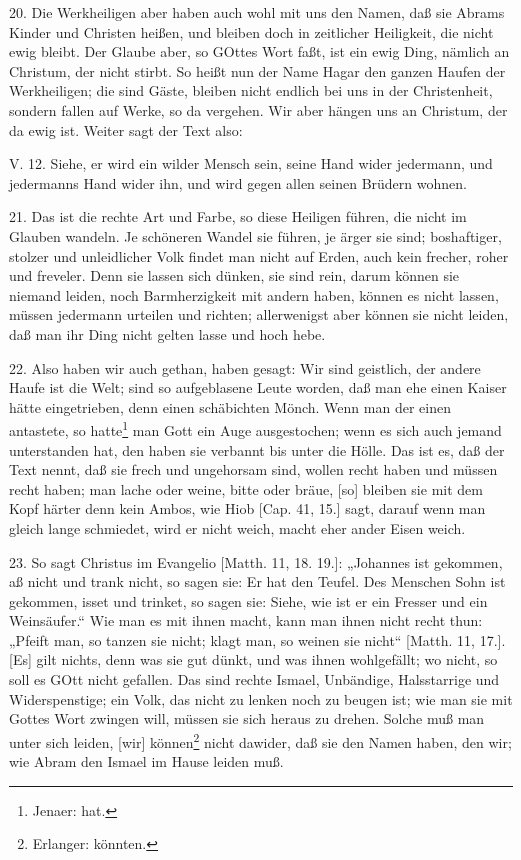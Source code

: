 20. Die Werkheiligen aber haben auch wohl mit uns den Namen, daß sie Abrams Kinder und Christen heißen, und bleiben doch in zeitlicher Heiligkeit, die nicht ewig bleibt. Der Glaube aber, so GOttes Wort faßt, ist ein ewig Ding, nämlich an Christum, der nicht stirbt. So heißt nun der Name Hagar den ganzen Haufen der Werkheiligen; die sind Gäste, bleiben nicht endlich bei uns in der Christenheit, sondern fallen auf Werke, so da vergehen. Wir aber hängen uns an Christum, der da ewig ist. Weiter sagt der Text also:

\begin{schriftzitat}
V. 12. Siehe, er wird ein wilder Mensch sein, seine Hand wider jedermann, und jedermanns Hand wider ihn, und wird gegen allen seinen Brüdern wohnen.
\end{schriftzitat}

21. Das ist die rechte Art und Farbe, so diese Heiligen führen, die nicht im Glauben wandeln. Je schöneren Wandel sie führen, je ärger sie sind; boshaftiger, stolzer und unleidlicher Volk findet man nicht auf Erden, auch kein frecher, roher und freveler. Denn sie lassen sich dünken, sie sind rein, darum können sie niemand leiden, noch Barmherzigkeit mit andern haben, können es nicht lassen, müssen jedermann urteilen und richten; allerwenigst aber können sie nicht leiden, daß man ihr Ding nicht gelten lasse und hoch hebe.

22. Also haben wir auch gethan, haben gesagt: Wir sind geistlich, der andere Haufe ist die Welt; sind so aufgeblasene Leute worden, daß man ehe einen Kaiser hätte eingetrieben, denn einen schäbichten Mönch. Wenn man der einen antastete, so hatte\footnote{Jenaer: hat.} man Gott ein Auge ausgestochen; wenn es sich auch jemand unterstanden hat, den haben sie verbannt bis unter die Hölle. Das ist es, daß der Text nennt, daß sie frech und ungehorsam sind, wollen recht haben und müssen recht haben; man lache oder weine, bitte oder bräue, [so] bleiben sie mit dem Kopf härter denn kein Ambos, wie Hiob [Cap. 41, 15.] sagt, darauf wenn man gleich lange schmiedet, wird er nicht weich, macht eher ander Eisen weich.

23. So sagt Christus im Evangelio [Matth. 11, 18. 19.]: „Johannes ist gekommen, aß nicht und trank nicht, so sagen sie: Er hat den Teufel. Des Menschen Sohn ist gekommen, isset und trinket, so sagen sie: Siehe, wie ist er ein Fresser und ein Weinsäufer.“ Wie man es mit ihnen macht, kann man ihnen nicht recht thun: „Pfeift man, so tanzen sie nicht; klagt man, so weinen sie nicht“ [Matth. 11, 17.]. [Es] gilt nichts, denn was sie gut dünkt, und was ihnen wohlgefällt; wo nicht, so soll es GOtt nicht gefallen. Das sind rechte Ismael, Unbändige, Halsstarrige und Widerspenstige; ein Volk, das nicht zu lenken noch zu beugen ist; wie man sie mit Gottes Wort zwingen will, müssen sie sich heraus zu drehen. Solche muß man unter sich leiden, [wir] können\footnote{Erlanger: könnten.} nicht dawider, daß sie den Namen haben, den wir; wie Abram den Ismael im Hause leiden muß.

